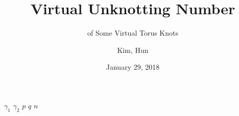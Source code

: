 \documentclass[10pt]{beamer}
\title{Virtual Unknotting Number}
\subtitle{of Some Virtual Torus Knots}
\date{January 29, 2018}
\author{Kim, Hun}
\institute{Korea Science Academy of KAIST}
\theoremstyle{plain}%
\theoremstyle{definition}
\begin{document}
\maketitle


\begin{frame}

$\gamma_1$
$\gamma_2$
$p$
$q$
$n$


\end{frame}
\end{document}
